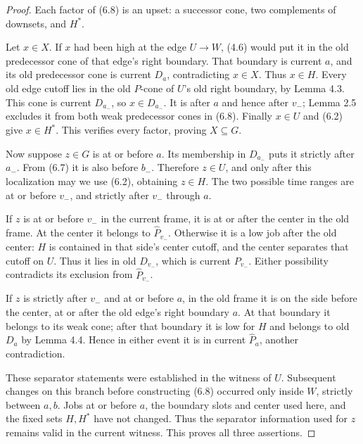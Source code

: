 \begin{proof}
Each factor of (6.8) is an upset: a successor cone, two complements of downsets, and \(H^*\).

Let \(x\in X\). If \(x\) had been high at the edge \(U\to W\), (4.6) would put it in the old predecessor cone of that edge's right boundary. That boundary is current \(a\), and its old predecessor cone is current \(D_a\), contradicting \(x\in X\). Thus \(x\in H\). Every old edge cutoff lies in the old \(P\)-cone of \(U\)'s old right boundary, by Lemma 4.3. This cone is current \(D_{a_-}\), so \(x\in D_{a_-}\). It is after \(a\) and hence after \(v_-\); Lemma 2.5 excludes it from both weak predecessor cones in (6.8). Finally \(x\in U\) and (6.2) give \(x\in H^*\). This verifies every factor, proving \(X\subseteq G\).

Now suppose \(z\in G\) is at or before \(a\). Its membership in \(D_{a_-}\) puts it strictly after \(a_-\). From (6.7) it is also before \(b_-\). Therefore \(z\in U\), and only after this localization may we use (6.2), obtaining \(z\in H\). The two possible time ranges are at or before \(v_-\), and strictly after \(v_-\) through \(a\).

If \(z\) is at or before \(v_-\) in the current frame, it is at or after the center in the old frame. At the center it belongs to \(\widehat P_{v_-}\). Otherwise it is a low job after the old center: \(H\) is contained in that side's center cutoff, and the center separates that cutoff on \(U\). Thus it lies in old \(D_{v_-}\), which is current \(P_{v_-}\). Either possibility contradicts its exclusion from \(\widehat P_{v_-}\).

If \(z\) is strictly after \(v_-\) and at or before \(a\), in the old frame it is on the side before the center, at or after the old edge's right boundary \(a\). At that boundary it belongs to its weak cone; after that boundary it is low for \(H\) and belongs to old \(D_a\) by Lemma 4.4. Hence in either event it is in current \(\widehat P_a\), another contradiction.

These separator statements were established in the witness of \(U\). Subsequent changes on this branch before constructing (6.8) occurred only inside \(W\), strictly between \(a,b\). Jobs at or before \(a\), the boundary slots and center used here, and the fixed sets \(H,H^*\) have not changed. Thus the separator information used for \(z\) remains valid in the current witness. This proves all three assertions.
\end{proof}

